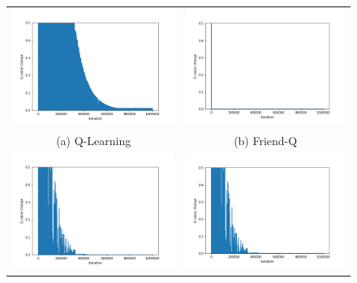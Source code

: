 \documentclass[conference]{IEEEtran}
\begin{document}
\begin{figure}
	\begin{tabular}{cc}
		\includegraphics[width=3.4in]{figures/Q.png} &
		\includegraphics[width=3.4in]{figures/friendQ.png} \\
		(a) Q-Learning & (b) Friend-Q \\
		\includegraphics[width=3.4in]{figures/foeQ.png} &
		\includegraphics[width=3.4in]{figures/ceQ.png} \\

\end{tabular}
\end{figure}
\end{document}
